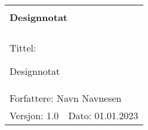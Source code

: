 \begin{minipage}[c]{0.15\textwidth}

\end{minipage}
\begin{minipage}[c]{0.85\textwidth}

\renewcommand{\arraystretch}{1.7}
\large 
\begin{tabularx}{\textwidth}{|X|X|}
\hline
\multicolumn{2}{|l|}{} \\
\multicolumn{2}{|l|}{\huge \textbf{Designnotat}} \\
\multicolumn{2}{|l|}{}  \\
\hline
\multicolumn{2}{|l|}{Tittel: 

Designnotat
} \\
\hline
\multicolumn{2}{|l|}{Forfattere: 
Navn Navnesen
} \\
\hline
Versjon: 1.0 & Dato: 01.01.2023
\\
\hline 
\end{tabularx}
\end{minipage}
\normalsize